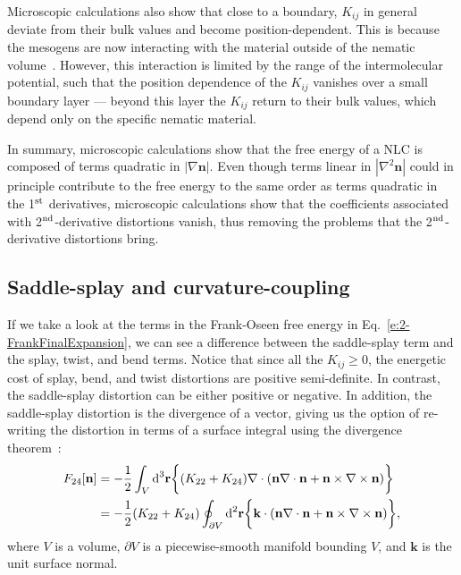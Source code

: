 Microscopic calculations also show that close to a boundary, $K_{ij}$ in general deviate from their bulk values and become position-dependent.
This is because the mesogens are now interacting with the material outside of the nematic volume~\cite{RN56,RN57,RN55}.
However, this interaction is limited by the range of the intermolecular potential, such that the position dependence of the $K_{ij}$ vanishes over a small boundary layer --- beyond this layer the $K_{ij}$ return to their bulk values, which depend only on the specific nematic material.

In summary, microscopic calculations show that the free energy of a NLC is composed of terms quadratic in $|\nabla \mathbf{n}|$.
Even though terms linear in $|\nabla ^2 \mathbf{n}|$ could in principle contribute to the free energy to the same order as terms quadratic in the 1$^\textup{\rm st}$ derivatives, microscopic calculations show that the coefficients associated with 2$^\textup{\rm nd}$-derivative distortions vanish, thus removing the problems that the 2$^\textup{\rm nd}$-derivative distortions bring.


\subsection{Saddle-splay and curvature-coupling}
If we take a look at the terms in the Frank-Oseen free energy in Eq.~\ref{e:2-FrankFinalExpansion}, we can see a difference between the saddle-splay term and the splay, twist, and bend terms.
Notice that since all the $K_{ij} \geq 0$, the energetic cost of splay, bend, and twist distortions are positive semi-definite.
In contrast, the saddle-splay distortion can be either positive or negative.
In addition, the saddle-splay distortion is the divergence of a vector, giving us the option of re-writing the distortion in terms of a surface integral using the divergence theorem~\cite{RN230}:
\begin{align}
  F_{24}[\mathbf{n}] &= - \frac{1}{2}\int_{V} \textup{d}^3  \mathbf{r} \bigg \{ (K_{22} + K_{24})  \nabla \cdot (\mathbf{n}\nabla \cdot \mathbf{n} + \mathbf{n} \times \nabla \times \mathbf{n}) \bigg \}\label{e:2-F24GaussA}  \\ &=
  - \frac{1}{2}(K_{22} + K_{24}) \oint_{\partial V} \textup{d}^2  \mathbf{r} \bigg \{   \mathbf{k} \cdot (\mathbf{n}\nabla \cdot \mathbf{n} + \mathbf{n} \times \nabla \times \mathbf{n}) \bigg \},\label{e:2-F24GaussB}
\end{align}
where $V$ is a volume, $\partial V$ is a piecewise-smooth manifold bounding $V$, and $\mathbf{k}$ is the unit surface normal.

